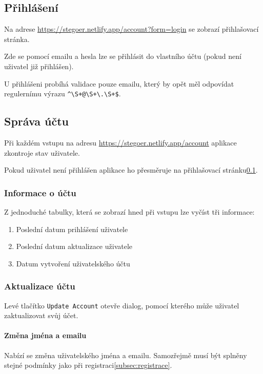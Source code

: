 \subsection{Přihlášení}\label{subsec:prihlaseni}
Na adrese \url{https://stegoer.netlify.app/account?form=login} se zobrazí
přihlašovací stránka.

Zde se pomocí emailu a hesla lze se přihlásit do vlastního účtu (pokud není
uživatel již přihlášen).

U přihlášeni probíhá validace pouze emailu, který by opět měl odpovídat
regulernímu výrazu \verb/^\S+@\S+\.\S+$/.

\subsection{Správa účtu}\label{subsec:sprava-uctu}
Při každém vstupu na adresu \url{https://stegoer.netlify.app/account} aplikace
zkontroje stav uživatele.

Pokud uživatel není přihlášen aplikace ho přesměruje na přihlašovací
stránku\ref{subsec:prihlaseni}.

\subsubsection{Informace o účtu}

Z jednoduché tabulky, která se zobrazí hned při vstupu lze vyčíst tři informace:

\begin{enumerate}
    \item Poslední datum prihlášení uživatele
    \item Poslední datum aktualizace uživatele
    \item Datum vytvoření uživatelského účtu
\end{enumerate}

\subsubsection{Aktualizace účtu}

Levé tlačítko \texttt{Update Account} otevře dialog, pomocí kterého může
uživatel zaktualizovat svůj účet.

\paragraph{Změna jména a emailu}

Nabízí se změna uživatelského jména a emailu.
Samozřejmě musí být splněny stejné podmínky jako při
registraci\ref{subsec:registrace}.

